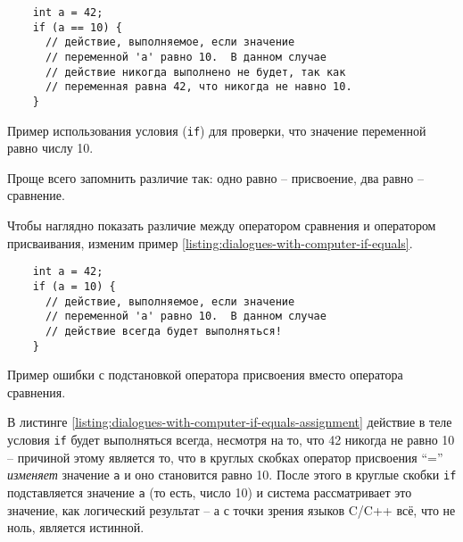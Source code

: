 \documentclass[../sparc.tex]{subfiles}
\begin{document}
\begin{listing}[ht]
  \begin{verbatim}
    int a = 42;
    if (a == 10) {
      // действие, выполняемое, если значение
      // переменной 'a' равно 10.  В данном случае
      // действие никогда выполнено не будет, так как
      // переменная равна 42, что никогда не навно 10.
    }
  \end{verbatim}
  \label{listing:dialogues-with-computer-if-equals}
  \caption{Пример использования условия (\texttt{if}) для проверки, что значение
    переменной равно числу 10.}
\end{listing}


Проще всего запомнить различие так: одно равно -- присвоение, два равно --
сравнение.

Чтобы наглядно показать различие между оператором сравнения и оператором
присваивания, изменим пример \ref{listing:dialogues-with-computer-if-equals}.

\begin{listing}[ht]
  \begin{verbatim}
    int a = 42;
    if (a = 10) {
      // действие, выполняемое, если значение
      // переменной 'a' равно 10.  В данном случае
      // действие всегда будет выполняться!
    }
  \end{verbatim}
  \label{listing:dialogues-with-computer-if-equals-assignment}
  \caption{Пример ошибки с подстановкой оператора присвоения вместо оператора
    сравнения.}
\end{listing}

В листинге \ref{listing:dialogues-with-computer-if-equals-assignment} действие в
теле условия \texttt{if} будет выполняться всегда, несмотря на то, что 42
никогда не равно 10 -- причиной этому является то, что в круглых скобках оператор
присвоения ``='' \emph{изменяет} значение \texttt{a} и оно становится равно 10.
После этого в круглые скобки \texttt{if} подставляется значение \texttt{a} (то
есть, число 10) и система рассматривает это значение, как логический результат --
а с точки зрения языков C/C++ всё, что не ноль, является истинной.
\end{document}
